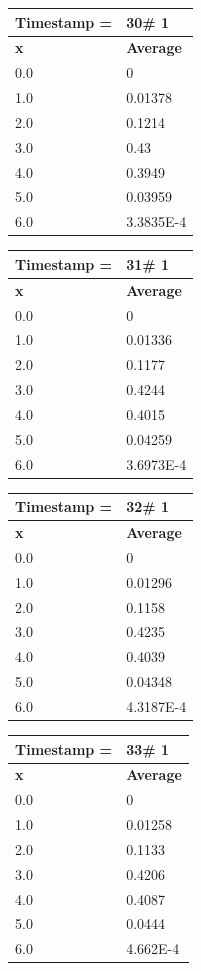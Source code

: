 \begin{tabular}{|l||l|}
\hline
\textbf{Timestamp =} & \textbf{30}\# 1\\\hline
	\textbf{x} & \textbf{Average} \\ \hline
\hline
	0.0 & 0 \\ \hline
	1.0 & 0.01378 \\ \hline
	2.0 & 0.1214 \\ \hline
	3.0 & 0.43 \\ \hline
	4.0 & 0.3949 \\ \hline
	5.0 & 0.03959 \\ \hline
	6.0 & 3.3835E-4 \\ \hline
\end{tabular}
\begin{tabular}{|l||l|}
\hline
\textbf{Timestamp =} & \textbf{31}\# 1\\\hline
	\textbf{x} & \textbf{Average} \\ \hline
\hline
	0.0 & 0 \\ \hline
	1.0 & 0.01336 \\ \hline
	2.0 & 0.1177 \\ \hline
	3.0 & 0.4244 \\ \hline
	4.0 & 0.4015 \\ \hline
	5.0 & 0.04259 \\ \hline
	6.0 & 3.6973E-4 \\ \hline
\end{tabular}

\begin{tabular}{|l||l|}
\hline
\textbf{Timestamp =} & \textbf{32}\# 1\\\hline
	\textbf{x} & \textbf{Average} \\ \hline
\hline
	0.0 & 0 \\ \hline
	1.0 & 0.01296 \\ \hline
	2.0 & 0.1158 \\ \hline
	3.0 & 0.4235 \\ \hline
	4.0 & 0.4039 \\ \hline
	5.0 & 0.04348 \\ \hline
	6.0 & 4.3187E-4 \\ \hline
\end{tabular}
\begin{tabular}{|l||l|}
\hline
\textbf{Timestamp =} & \textbf{33}\# 1\\\hline
	\textbf{x} & \textbf{Average} \\ \hline
\hline
	0.0 & 0 \\ \hline
	1.0 & 0.01258 \\ \hline
	2.0 & 0.1133 \\ \hline
	3.0 & 0.4206 \\ \hline
	4.0 & 0.4087 \\ \hline
	5.0 & 0.0444 \\ \hline
	6.0 & 4.662E-4 \\ \hline
\end{tabular}

